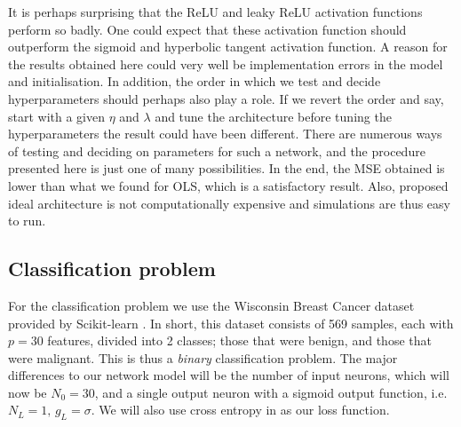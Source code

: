     It is perhaps surprising that the ReLU and leaky ReLU activation functions perform so badly. One could expect that these activation function should outperform the sigmoid and hyperbolic tangent activation function. A reason for the results obtained here could very well be implementation errors in the model and initialisation. In addition, the order in which we test and decide hyperparameters should perhaps also play a role. If we revert the order and say, start with a given $\eta$ and $\lambda$ and tune the architecture before tuning the hyperparameters the result could have been different. There are numerous ways of testing and deciding on parameters for such a network, and the procedure presented here is just one of many possibilities. In the end, the MSE obtained is lower than what we found for OLS, which is a satisfactory result. Also, proposed ideal architecture is not computationally expensive and simulations are thus easy to run. 

  






\subsection{Classification problem}\label{sec:analysis_classification}
    For the classification problem we use the Wisconsin Breast Cancer dataset provided by Scikit-learn \citep{scikit-learn}. In short, this dataset consists of 569 samples, each with $p=30$ features, divided into 2 classes; those that were benign, and those that were malignant. This is thus a \textit{binary} classification problem. The major differences to our network model will be the number of input neurons, which will now be $N_0=30$, and a single output neuron with a sigmoid output function, i.e. $N_L=1, \, g_L=\sigma$. We will also use cross entropy in  as our loss function. 
    
